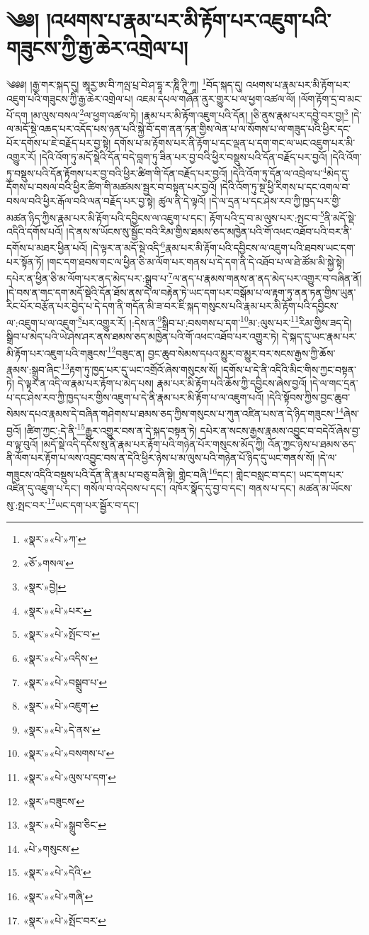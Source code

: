 \chapter{༄༅། །འཕགས་པ་རྣམ་པར་མི་རྟོག་པར་འཇུག་པའི་གཟུངས་ཀྱི་རྒྱ་ཆེར་འགྲེལ་པ།}༄༅༅། །རྒྱ་གར་སྐད་དུ། ཨཱརྱ་ཨ་བི་ཀལྤ་པྲ་བེ་ཤ་དྷཱ་ར་ཎཱི་ཊཱི་ཀཱ། \footnote{«སྣར་»«པེ་»ཀ་}བོད་སྐད་དུ། འཕགས་པ་རྣམ་པར་མི་རྟོག་པར་འཇུག་པའི་གཟུངས་ཀྱི་རྒྱ་ཆེར་འགྲེལ་པ། འཇམ་དཔལ་གཞོན་ནུར་གྱུར་པ་ལ་ཕྱག་འཚལ་ལོ། །ལོག་རྟོག་དྲ་བ་མང་པོ་དག །མ་ལུས་བསལ་\footnote{«ཅོ་»གསལ་}ལ་ཕྱག་འཚལ་ཏེ། །རྣམ་པར་མི་རྟོག་འཇུག་པའི་དོན། །ཅི་ནུས་རྣམ་པར་དབྱེ་བར་བྱ།\footnote{«སྣར་»བྱེ།} །དེ་ལ་མདོ་སྡེ་འཆད་པར་འདོད་པས་ཉན་པའི་སྐྱེ་བོ་དག་ནན་ཏན་གྱིས་ལེན་པ་ལ་སོགས་པ་ལ་གཟུད་པའི་ཕྱིར་དང་པོར་དགོས་པ་ཇེ་བརྗོད་པར་བྱ་སྟེ། དགོས་པ་མ་རྟོགས་པར་ནི་རྟོག་པ་དང་ལྡན་པ་དག་གང་ལ་ཡང་འཇུག་པར་མི་འགྱུར་རོ། །དེའི་འོག་ཏུ་མདོ་སྡེའི་དོན་བདེ་བླག་ཏུ་ཟིན་པར་བྱ་བའི་ཕྱིར་བསྡུས་པའི་དོན་བརྗོད་པར་བྱའོ། །དེའི་འོག་ཏུ་བསྡུས་པའི་དོན་རྟོགས་པར་བྱ་བའི་ཕྱིར་ཚིག་གི་དོན་བརྗོད་པར་བྱའོ། །དེའི་འོག་ཏུ་དོན་ལ་འབྲེལ་པ་\footnote{«སྣར་»«པེ་»པར་}མེད་དུ་དོགས་པ་བསལ་བའི་ཕྱིར་ཚིག་གི་མཚམས་སྦྱར་བ་བསྟན་པར་བྱའོ། །དེའི་འོག་ཏུ་སྔ་ཕྱི་རིགས་པ་དང་འགལ་བ་བསལ་བའི་ཕྱིར་རྒོལ་བའི་ལན་བརྗོད་པར་བྱ་སྟེ། ཚུལ་ནི་དེ་ལྟའོ། །དེ་ལ་དྲན་པ་དང་ཤེས་རབ་ཀྱི་ཁྱད་པར་གྱི་མཚན་ཉིད་ཀྱིས་རྣམ་པར་མི་རྟོག་པའི་དབྱིངས་ལ་འཇུག་པ་དང་། རྟོག་པའི་དྲ་བ་མ་ལུས་པར་:སྤང་བ་\footnote{«སྣར་»«པེ་»སྤོང་བ་}ནི་མདོ་སྡེ་འདིའི་དགོས་པའོ། །དེ་ནས་ས་ཡོངས་སུ་སྦྱོང་བའི་རིམ་གྱིས་ཐམས་ཅད་མཁྱེན་པའི་གོ་འཕང་འཐོབ་པའི་བར་ནི་དགོས་པ་མཐར་ཕྱིན་པའོ། །དེ་ལྟར་ན་མདོ་སྡེ་འདི་\footnote{«སྣར་»«པེ་»འདིས་}རྣམ་པར་མི་རྟོག་པའི་དབྱིངས་ལ་འཇུག་པའི་ཐབས་ཡང་དག་པར་སྟོན་ཏོ། །གང་དག་ཐབས་གང་ལ་ཕྱིན་ཅི་མ་ལོག་པར་གནས་པ་དེ་དག་ནི་དེ་འཐོབ་པ་ལ་ཐེ་ཚོམ་མི་སྐྱེ་སྟེ། དཔེར་ན་ཕྱིན་ཅི་མ་ལོག་པར་ནད་མེད་པར་:སྒྲུབ་པ་\footnote{«སྣར་»«པེ་»བསྒྲུབ་པ་}ལ་ནད་པ་རྣམས་གནས་ན་ནད་མེད་པར་འགྱུར་བ་བཞིན་ནོ། །དེ་བས་ན་གང་དག་མདོ་སྡེའི་དོན་ཐོས་ནས་དེ་ལ་བརྟེན་ཏེ་ཡང་དག་པར་བསྒོམ་པ་ལ་རྟག་ཏུ་ནན་ཏན་གྱིས་ཡུན་རིང་པོར་བརྩོན་པར་བྱེད་པ་དེ་དག་ནི་གདོན་མི་ཟ་བར་ཇི་སྐད་གསུངས་པའི་རྣམ་པར་མི་རྟོག་པའི་དབྱིངས་ལ་:འཇུག་པ་ལ་འཇུག་\footnote{«སྣར་»«པེ་»འཇུག་}པར་འགྱུར་རོ། །:དེས་ན་\footnote{«སྣར་»«པེ་»དེ་ནས་}སྒྲིབ་པ་:བསགས་པ་དག་\footnote{«སྣར་»«པེ་»བསགས་པ་}མ་:ལུས་པར་\footnote{«སྣར་»«པེ་»ལུས་པ་དག་}རིམ་གྱིས་ཟད་དེ། སྒྲིབ་པ་མེད་པའི་ཡེ་ཤེས་ཤར་ནས་ཐམས་ཅད་མཁྱེན་པའི་གོ་འཕང་འཐོབ་པར་འགྱུར་ཏེ། དེ་སྐད་དུ་ཡང་རྣམ་པར་མི་རྟོག་པར་འཇུག་པའི་གཟུངས་\footnote{«སྣར་»བཟུངས་}བཟུང་ན། བྱང་ཆུབ་སེམས་དཔའ་མྱུར་བ་མྱུར་བར་སངས་རྒྱས་ཀྱི་ཆོས་རྣམས་:སྒྲུབ་ཞིང་\footnote{«སྣར་»«པེ་»སྒྲུབ་ཅིང་}རྟག་ཏུ་ཁྱད་པར་དུ་ཡང་འགྲོའོ་ཞེས་གསུངས་སོ། །དགོས་པ་དེ་ནི་འདིའི་མིང་གིས་ཀྱང་བསྟན་ཏེ། དེ་ལྟར་ན་འདི་ལ་རྣམ་པར་རྟོག་པ་མེད་པས། རྣམ་པར་མི་རྟོག་པའི་ཆོས་ཀྱི་དབྱིངས་ཞེས་བྱའོ། །དེ་ལ་གང་དྲན་པ་དང་ཤེས་རབ་ཀྱི་ཁྱད་པར་གྱིས་འཇུག་པ་དེ་ནི་རྣམ་པར་མི་རྟོག་པ་ལ་འཇུག་པའོ། །དེའི་སྟོབས་ཀྱིས་བྱང་ཆུབ་སེམས་དཔའ་རྣམས་དེ་བཞིན་གཤེགས་པ་ཐམས་ཅད་ཀྱིས་གསུངས་པ་ཀུན་འཛིན་པས་ན་དེ་ཉིད་གཟུངས་\footnote{«པེ་»གསུངས་}ཞེས་བྱའོ། །ཚིག་ཀྱང་:དེ་ནི་\footnote{«སྣར་»«པེ་»དེའི་}རྒྱུར་འགྱུར་བས་ན་དེ་སྐད་བསྟན་ཏེ། དཔེར་ན་སངས་རྒྱས་རྣམས་འབྱུང་བ་བདེའོ་ཞེས་བྱ་བ་ལྟ་བུའོ། །མདོ་སྡེ་འདི་དངོས་སུ་ནི་རྣམ་པར་རྟོག་པའི་གཉེན་པོར་གསུངས་མོད་ཀྱི། འོན་ཀྱང་ཉེས་པ་ཐམས་ཅད་ནི་ལོག་པར་རྟོག་པ་ལས་འབྱུང་བས་ན་དེའི་ཕྱིར་ཉེས་པ་མ་ལུས་པའི་གཉེན་པོ་ཉིད་དུ་ཡང་གནས་སོ། །དེ་ལ་གཟུངས་འདིའི་བསྡུས་པའི་དོན་ནི་རྣམ་པ་བཅུ་བཞི་སྟེ། གླེང་བཞི་\footnote{«སྣར་»«པེ་»གཞི་}དང་། གླེང་བསླང་བ་དང་། ཡང་དག་པར་འཛིན་དུ་འཇུག་པ་དང་། གསོལ་བ་འདེབས་པ་དང་། འཁོར་སྣོད་དུ་བྱ་བ་དང་། གནས་པ་དང་། མཚན་མ་ཡོངས་སུ་:སྤང་བར་\footnote{«སྣར་»«པེ་»སྤོང་བར་}ཡང་དག་པར་སྦྱོར་བ་དང་། 